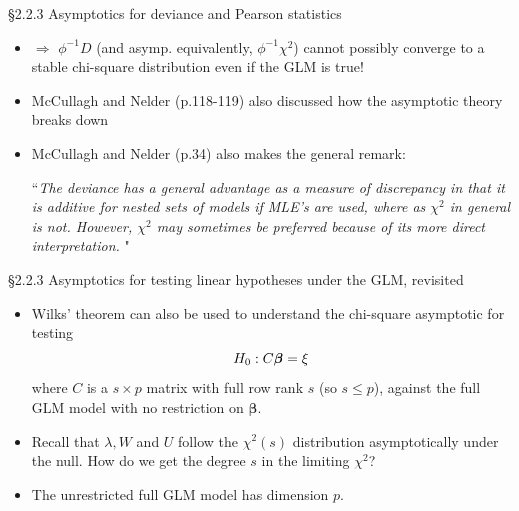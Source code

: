 \documentclass{beamer}
\newcommand{\boldbeta}{{\boldsymbol \beta}}
\newenvironment{wideitemize}%
  {\begin{itemize}%
    \setlength{\parskip}{1em}}%
  {\end{itemize}}
\begin{document}
\begin{frame}{\S2.2.3  Asymptotics for deviance and Pearson statistics  }
\begin{wideitemize}



\item $\Rightarrow$ $\phi^{-1}D$ (and asymp. equivalently, $\phi^{-1}\chi^2$) cannot possibly converge to a stable chi-square distribution even if the GLM is true!


\item McCullagh and Nelder (p.118-119) also discussed how the asymptotic theory breaks down


\item McCullagh and Nelder (p.34) also makes the general remark:
 \ \

``\emph{The deviance has a general advantage as a measure of discrepancy in that it is additive for nested sets of models if MLE's are used, where as $\chi^2$ in general is not. However, $\chi^2$ may sometimes be preferred because of its more direct interpretation.} "
\end{wideitemize}
\end{frame}





\begin{frame}{\S2.2.3  Asymptotics for testing linear hypotheses under the GLM, revisited }

\begin{wideitemize}
\item Wilks' theorem can also be used to understand the  chi-square asymptotic for testing 
\[
H_0: C{\boldmath \boldbeta}={\boldmath \xi} 
\] 
where $C$ is a $s \times p$ matrix with full row rank $s$ (so $s \leq p$), against the full GLM model with no restriction on $\boldbeta$.

\item Recall that 
$\lambda, W$ and
$U$  follow the $\chi^2(s)$ distribution asymptotically under the null. How do we get the degree $s$ in the limiting $\chi^2$?

\item The unrestricted full GLM model has dimension $p$.
\end{wideitemize}


\end{frame}
\end{document}
